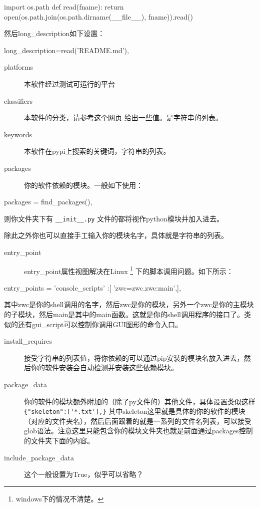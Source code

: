 \documentclass[11pt,oneside]{article}
\begin{document}
\begin{tcbpython}
import os.path
def read(fname):
    return open(os.path.join(os.path.dirname(__file__), fname)).read()
\end{tcbpython}

然后long\_description如下设置：
\begin{tcbpython}
long_description=read('README.md'),
\end{tcbpython}

\begin{description}
\item[{platforms}] 本软件经过测试可运行的平台
\item[{classifiers}] 本软件的分类，请参考\href{https://pypi.python.org/pypi?\%3Aaction=list_classifiers}{这个网页} 给出一些值。是字符串的列表。
\item[{keywords}] 本软件在pypi上搜索的关键词，字符串的列表。
\item[{packages}] 你的软件依赖的模块。一般如下使用：
\end{description}

\begin{tcbpython}
packages = find_packages(),
\end{tcbpython}

则你文件夹下有 \verb~__init__.py~ 文件的都将视作python模块并加入进去。

除此之外你也可以直接手工输入你的模块名字，具体就是字符串的列表。
\begin{description}
\item[{entry\_point}] entry\_point属性视图解决在Linux \footnote{windows下的情况不清楚。} 下的脚本调用问题。如下所示：
\end{description}

\begin{tcbpython}
entry_points = {
'console_scripts' :[ 'zwc=zwc.zwc:main',],
}
\end{tcbpython}

其中zwc是你的shell调用的名字，然后zwc是你的模块，另外一个zwc是你的主模块的子模块，然后main是其中的main函数。这就是你的shell调用程序的接口了。类似的还有gui\_script可以控制你调用GUI图形的命令入口。
\begin{description}
\item[{install\_requires}] 接受字符串的列表值，将你依赖的可以通过pip安装的模块名放入进去，然后你的软件安装会自动检测并安装这些依赖模块。
\item[{package\_data}] 你的软件的模块额外附加的（除了py文件的）其他文件，具体设置类似这样 \verb~{"skeleton":['*.txt'],}~ 其中skeleton这里就是具体的你的软件的模块（对应的文件夹名），然后后面跟着的就是一系列的文件名列表，可以接受glob语法。注意这里只能包含你的模块文件夹也就是前面通过packages控制的文件夹下面的内容。
\item[{include\_package\_data}] 这个一般设置为True，似乎可以省略？
\end{description}
\end{document}
